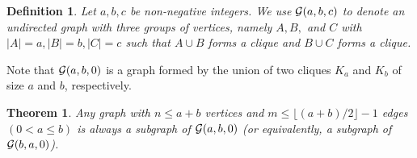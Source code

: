 \documentclass[12pt,a4paper]{article}
\title{}
\author{}
\newtheorem{theorem}{Theorem}
\newtheorem{definition}{Definition}
\begin{document}
\begin{definition}
Let $a,b,c$ be non-negative integers.  We use ${\cal G}(a,b,c)$ to denote an undirected graph with three groups of vertices,  namely $A, B,$ and $C$ with $|A| = a, |B|=b, |C|=c$ such that $A \cup B$ forms a clique and $B \cup C$ forms a clique.
\end{definition}

\noindent
Note that ${\cal G}(a,b,0)$ is a graph formed by the union of two cliques $K_a$ and $K_b$ of size $a$ and $b$, respectively.

\begin{theorem}
Any graph with $n \leq a + b$ vertices and $m \leq \lfloor (a+b)/2 \rfloor-1$ edges $(0<a \leq b)$ 
is always a subgraph of ${\cal G}(a,b,0)$ (or equivalently, a subgraph of ${\cal G}(b,a,0)$).
\end{theorem}
\end{document}
